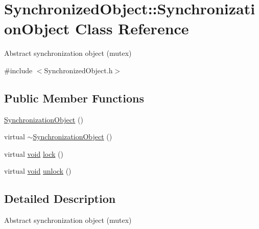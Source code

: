 \hypertarget{class_synchronized_object_1_1_synchronization_object}{\section{Synchronized\-Object\-:\-:Synchronization\-Object Class Reference}
\label{class_synchronized_object_1_1_synchronization_object}
}


Abstract synchronization object (mutex)  




{\ttfamily \#include $<$Synchronized\-Object.\-h$>$}

\subsection*{Public Member Functions}
\begin{DoxyCompactItemize}
\item 
\hyperlink{class_synchronized_object_1_1_synchronization_object_a67e78ad6521c30c5cf4f96c0b40be75c}{Synchronization\-Object} ()
\item 
virtual \hyperlink{class_synchronized_object_1_1_synchronization_object_ad17549ab19b32fcb3eafebc425ae9083}{$\sim$\-Synchronization\-Object} ()
\item 
virtual \hyperlink{wglew_8h_aeea6e3dfae3acf232096f57d2d57f084}{void} \hyperlink{class_synchronized_object_1_1_synchronization_object_a2c1a4b7e3e3a8f8993140fb1fc9dabe0}{lock} ()
\item 
virtual \hyperlink{wglew_8h_aeea6e3dfae3acf232096f57d2d57f084}{void} \hyperlink{class_synchronized_object_1_1_synchronization_object_a2af2a59901a0cdc673dc8729840fe797}{unlock} ()
\end{DoxyCompactItemize}


\subsection{Detailed Description}
Abstract synchronization object (mutex) 

